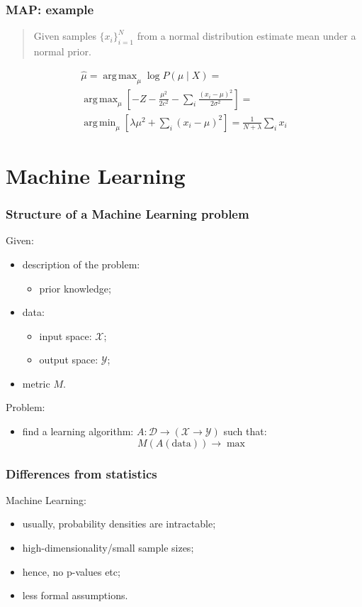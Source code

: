 \documentclass[mathserif, aspectratio=43]{beamer}
\DeclareMathOperator*{\argmin}{\mathrm{arg\,min}}
\DeclareMathOperator*{\argmax}{\mathrm{arg\,max}}
\begin{document}
\begin{frame}[fragile]
\frametitle{MAP: example}
\begin{quote}
Given samples $\{x_i\}^N_{i = 1}$ from a normal distribution estimate mean under a normal prior.

\end{quote}
\begin{multline*}
  \hat{\mu} = \argmax_\mu \log P(\mu \mid X) = \\
    \argmax_\mu \left[ -Z -\frac{\mu ^ 2}{2 c^2} - \sum_i \frac{(x_i - \mu) ^ 2}{2 \sigma^2} \right] = \\
    \argmin_\mu \left[ \lambda \mu ^ 2 + \sum_i (x_i - \mu) ^ 2 \right] =
    \frac{1}{N + \lambda} \sum_i x_i
\end{multline*}

\end{frame}


\section{Machine Learning}



\begin{frame}[fragile]
\frametitle{Structure of a Machine Learning problem}
Given:
\begin{itemize}
\item description of the problem:\begin{itemize}
\item prior knowledge;
\end{itemize}

\item data:\begin{itemize}
\item input space: $\mathcal{X}$;
\item output space: $\mathcal{Y}$;
\end{itemize}

\item metric $M$.
\end{itemize}
Problem:
\begin{itemize}
\item find a learning algorithm: $A: \mathcal{D} \to (\mathcal{X} \to \mathcal{Y})$ such that:
$$M(A(\mathrm{data})) \to \max$$
\end{itemize}

\end{frame}


\begin{frame}[fragile]
\frametitle{Differences from statistics}
Machine Learning:
\begin{itemize}
\item usually, probability densities are intractable;
\item high-dimensionality/small sample sizes;
\item hence, no p-values etc;
\item less formal assumptions.
\end{itemize}

\end{frame}
\end{document}
